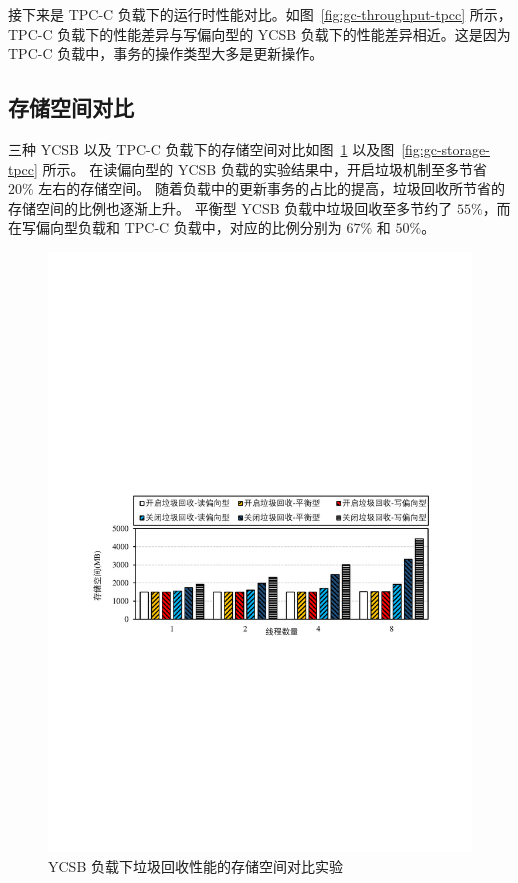 接下来是 TPC-C 负载下的运行时性能对比。如图~\ref{fig:gc-throughput-tpcc} 所示，TPC-C 负载下的性能差异与写偏向型的 YCSB 负载下的性能差异相近。这是因为 TPC-C 负载中，事务的操作类型大多是更新操作。



\subsection{存储空间对比}

三种 YCSB 以及 TPC-C 负载下的存储空间对比如图~\ref{fig:gc-storage-ycsb} 以及图~\ref{fig:gc-storage-tpcc} 所示。
在读偏向型的 YCSB 负载的实验结果中，开启垃圾机制至多节省 $20\%$ 左右的存储空间。
随着负载中的更新事务的占比的提高，垃圾回收所节省的存储空间的比例也逐渐上升。
平衡型 YCSB 负载中垃圾回收至多节约了 $55\%$，而在写偏向型负载和 TPC-C 负载中，对应的比例分别为 $67\%$ 和 $50\%$。

\begin{figure}
    \centering
    \includegraphics[width=15cm, trim={1cm 9cm 1cm 10cm}]{figures/gc-ycsb-storage.pdf}
    \caption{YCSB 负载下垃圾回收性能的存储空间对比实验}
    \label{fig:gc-storage-ycsb}
\end{figure}

